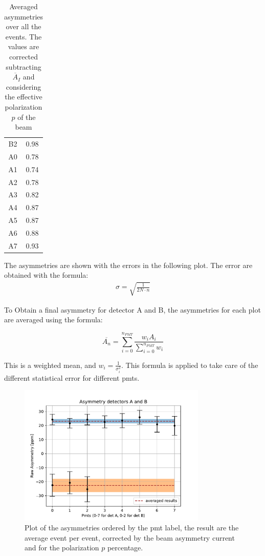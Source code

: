 \begin{table}[!ht]
{\begin{tabular}{c|c}
 B2    & 0.98 \\
 A0    & 0.78 \\
 A1    & 0.74 \\
 A2    & 0.78 \\
 A3    & 0.82 \\
 A4    & 0.87 \\
 A5    & 0.87 \\
 A6    & 0.88 \\
 A7    & 0.93 \\
\hline
\end{tabular}}
\caption{Averaged asymmetries over all the events. The values are corrected subtracting $\overline{A}_{I}$ and considering the effective polarization $p$ of the beam}
\end{table}

The asymmetries are shown with the errors in the following plot. The error are obtained with the formula:
\begin{align*}
\sigma = \sqrt{\frac{1}{2 N \cdot n}}
\end{align*}

To Obtain a final asymmetry for detector A and B, the asymmetries for each plot are averaged using the formula:

\begin{equation}
\overline{A_{n}} = \sum_{i = 0}^{n_{PMT}} \dfrac{ w_{i} A_{i}}{\sum_{i = 0}^{n_{PMT}} w_{i}}
\end{equation}

This is a weighted mean, and $w_{i} = \frac{1}{\sigma^{2}_{i}}$. This formula is applied to take care of the different statistical error for different pmts.

\begin{figure}[hbtp]
\centering
\includegraphics[width = 0.80\textwidth]{Analysis/Dataselection/FirstResult.pdf}
\caption{Plot of the asymmetries ordered by the pmt label, the result are the average event per event, corrected by the beam asymmetry current and for the polarization $p$ percentage.}
\end{figure}

